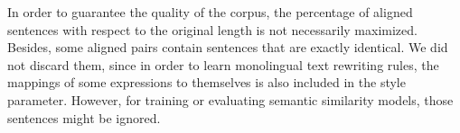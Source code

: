 In order to guarantee the quality of the corpus, the percentage of aligned sentences with respect to the original length is not necessarily maximized. Besides, some aligned pairs contain sentences that are exactly identical. We did not discard them, since in order to learn monolingual text rewriting rules, the mappings of some expressions to themselves is also included in the style parameter. However, for training or evaluating semantic similarity models, those sentences might be ignored.




